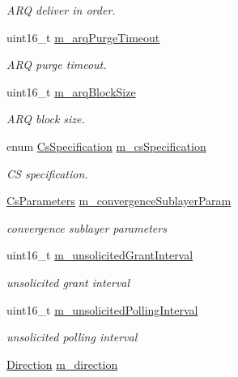 \begin{DoxyCompactItemize}
\begin{DoxyCompactList}\small\item\em A\+RQ deliver in order. \end{DoxyCompactList}\item 
uint16\+\_\+t \hyperlink{classns3_1_1ServiceFlow_a92fcfb80bb43ffe252aea99e8a51593b}{m\+\_\+arq\+Purge\+Timeout}
\begin{DoxyCompactList}\small\item\em A\+RQ purge timeout. \end{DoxyCompactList}\item 
uint16\+\_\+t \hyperlink{classns3_1_1ServiceFlow_a0ee048960c57c91cd2a41904682053bc}{m\+\_\+arq\+Block\+Size}
\begin{DoxyCompactList}\small\item\em A\+RQ block size. \end{DoxyCompactList}\item 
enum \hyperlink{classns3_1_1ServiceFlow_ad87f7547b7c053db4472543e17d21952}{Cs\+Specification} \hyperlink{classns3_1_1ServiceFlow_a17884a9cb0e15543e8d96f8241b680ae}{m\+\_\+cs\+Specification}
\begin{DoxyCompactList}\small\item\em CS specification. \end{DoxyCompactList}\item 
\hyperlink{classns3_1_1CsParameters}{Cs\+Parameters} \hyperlink{classns3_1_1ServiceFlow_a4add395bf3ab6259353e62227a88d04c}{m\+\_\+convergence\+Sublayer\+Param}
\begin{DoxyCompactList}\small\item\em convergence sublayer parameters \end{DoxyCompactList}\item 
uint16\+\_\+t \hyperlink{classns3_1_1ServiceFlow_a45c54537e6acf68f34a1c3b2f61cefa2}{m\+\_\+unsolicited\+Grant\+Interval}
\begin{DoxyCompactList}\small\item\em unsolicited grant interval \end{DoxyCompactList}\item 
uint16\+\_\+t \hyperlink{classns3_1_1ServiceFlow_a757b8a5d3178773cecb45ba00053207e}{m\+\_\+unsolicited\+Polling\+Interval}
\begin{DoxyCompactList}\small\item\em unsolicited polling interval \end{DoxyCompactList}\item 
\hyperlink{classns3_1_1ServiceFlow_ae14b8dc8bb371bad10fe078110655d4f}{Direction} \hyperlink{classns3_1_1ServiceFlow_aeadd654a7d1e5e6c64b6702fecc289dd}{m\+\_\+direction}

\end{DoxyCompactItemize}
